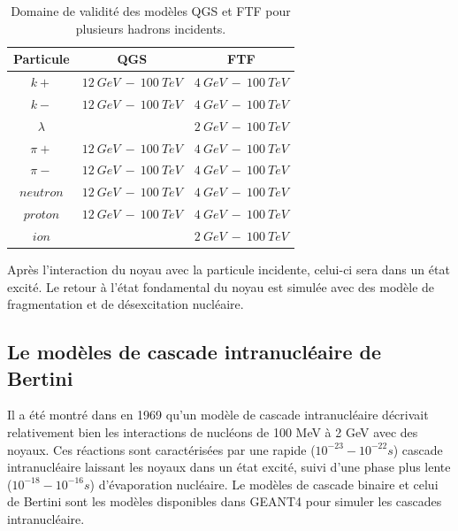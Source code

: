 \begin{table}[!ht]
  \begin{center}
    \begin{tabular}{c|c|c}
      Particule & QGS & FTF\\
      \hline
      $k+$ & $12\ GeV\ -\ 100\ TeV$ & $4\ GeV\ -\ 100\ TeV$\\
      $k-$ & $12\ GeV\ -\ 100\ TeV$ & $4\ GeV\ -\ 100\ TeV$\\
      $\lambda$ & $ $ & $2\ GeV\ -\ 100\ TeV$\\
      $\pi+$ & $12\ GeV\ -\ 100\ TeV$ & $4\ GeV\ -\ 100\ TeV$\\
      $\pi-$ & $12\ GeV\ -\ 100\ TeV$ & $4\ GeV\ -\ 100\ TeV$\\
      $neutron$ & $12\ GeV\ -\ 100\ TeV$ & $4\ GeV\ -\ 100\ TeV$\\
      $proton$ & $12\ GeV\ -\ 100\ TeV$ & $4\ GeV\ -\ 100\ TeV$\\
      $ion$ & $ $ & $2\ GeV\ -\ 100\ TeV$\\
    \end{tabular}
  \end{center}
  \caption{Domaine de validité des modèles QGS et FTF pour plusieurs hadrons incidents.}
  \label{tab.partonModelTable}
\end{table}

Après l'interaction du noyau avec la particule incidente, celui-ci sera dans un état excité. Le retour à l'état fondamental du noyau est simulée avec des modèle de fragmentation et de désexcitation nucléaire.
\subsection{Le modèles de cascade intranucléaire de Bertini}
\label{sec.inucl}
Il a été montré dans \cite{bertini} en 1969 qu'un modèle de cascade intranucléaire décrivait relativement bien les interactions de nucléons de 100 MeV à 2 GeV avec des noyaux. Ces réactions sont caractérisées par une rapide ($10^{-23}-10^{-22} s$) cascade intranucléaire laissant les noyaux dans un état excité, suivi d'une phase plus lente ($10^{-18}-10^{-16} s$) d'évaporation nucléaire. Le modèles de cascade binaire et celui de Bertini sont les modèles disponibles dans GEANT4 pour simuler les cascades intranucléaire.

